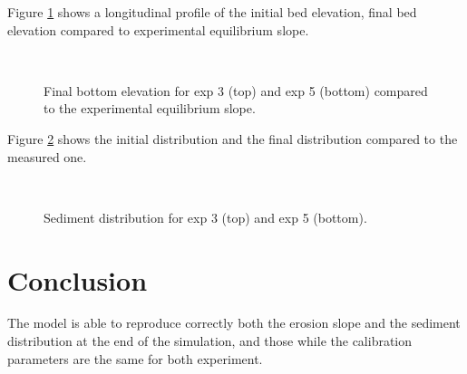 Figure \ref{guenter-t2d:fig:profile} shows a longitudinal profile of the initial bed elevation, final bed elevation compared to experimental equilibrium slope. 

\begin{figure}[H]
 \centering
 \\
 \caption{Final bottom elevation for exp 3 (top) and exp 5 (bottom) compared to the experimental equilibrium slope.}
 \label{guenter-t2d:fig:profile}
\end{figure}

Figure \ref{guenter-t2d:fig:distrib} shows the initial distribution and the final distribution compared to the measured one.

\begin{figure}[H]
 \centering
 \\
 \caption{Sediment distribution for exp 3 (top) and exp 5 (bottom).}
 \label{guenter-t2d:fig:distrib}
\end{figure}

%
\section{Conclusion}

The model is able to reproduce correctly both the erosion slope and the sediment distribution at the end of the simulation, and those while the calibration parameters are the same for both experiment.